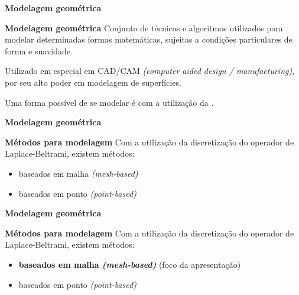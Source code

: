 \begin{frame}{{\bf \color{blue} Modelagem geométrica}}

\begin{block}{\bf Modelagem geométrica}
Conjunto de técnicas e algoritmos utilizados para modelar determinadas formas matemáticas, sujeitas a condições particulares de forma e suavidade.

\medskip

Utilizado em especial em CAD/CAM \textit{(computer aided design / manufacturing)}, por seu alto poder em modelagem de superfícies.

\medskip

Uma forma possível de se modelar é com a utilização da .
\end{block}

\end{frame}

\begin{frame}{{\bf \color{blue} Modelagem geométrica}}
	
	\begin{block}{\bf Métodos para modelagem}
		Com a utilização da discretização do operador de Laplace-Beltrami, existem métodos:
		\begin{itemize}
			\item baseados em malha \textit{(mesh-based)}
			\item baseados em ponto \textit{(point-based)}
		\end{itemize}
	\end{block}
\end{frame}

\begin{frame}{{\bf \color{blue} Modelagem geométrica}}
	
	\begin{block}{\bf Métodos para modelagem}
		Com a utilização da discretização do operador de Laplace-Beltrami, existem métodos:
		\begin{itemize}
			\item \textbf{baseados em malha \textit{(mesh-based)}} (foco da apresentação)
			\item baseados em ponto \textit{(point-based)}
		\end{itemize}
	\end{block}
\end{frame}

